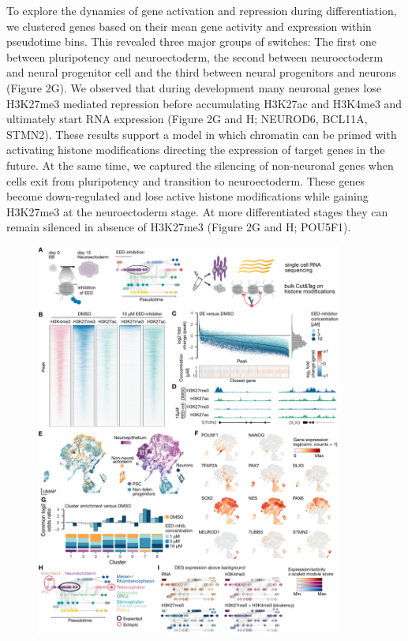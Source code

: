 To explore the dynamics of gene activation and repression during differentiation, we clustered genes based on their mean gene activity and expression within pseudotime bins. This revealed three major groups of switches: The first one between pluripotency and neuroectoderm, the second between neuroectoderm and neural progenitor cell and the third between neural progenitors and neurons (Figure 2G). We observed that during development many neuronal genes lose H3K27me3 mediated repression before accumulating H3K27ac and H3K4me3 and ultimately start RNA expression (Figure 2G and H; NEUROD6, BCL11A, STMN2). These results support a model in which chromatin can be primed with activating histone modifications directing the expression of target genes in the future. At the same time, we captured the silencing of non-neuronal genes when cells exit from pluripotency and transition to neuroectoderm. These genes become down-regulated and lose active histone modifications while gaining H3K27me3 at the neuroectoderm stage. At more differentiated stages they can remain silenced in absence of H3K27me3 (Figure 2G and H; POU5F1).

\begin{figure}[b!]
    \centering
	\includegraphics[width=0.9\textwidth]{figures/cnt/Figure_3}
    \label{fig:cnt2}
\end{figure}

